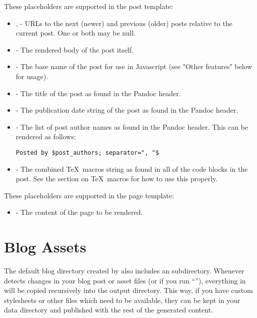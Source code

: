 \documentclass[11pt, letterpaper, oneside, titlepage]{book}
\begin{document}
These placeholders are supported in the post template:

\begin{itemize}
\item{,  - URLs to the
  next (newer) and previous (older) posts relative to the current
  post.  One or both may be null.}
\item{ - The rendered body of the post itself.}
\item{ - The base name of the post for use in
  Javascript (see "Other features" below for usage).}
\item{ - The title of the post as found in the Pandoc
  header.}
\item{ - The publication date string of the post as
  found in the Pandoc header.}
\item{ - The list of post author names as found in
  the Pandoc header.  This can be rendered as follows:
\begin{verbatim}
Posted by $post_authors; separator=", "$
\end{verbatim}
}
\item{ - The combined \TeX\ macros string as
  found in all of the  code blocks in the post.  See
  the section on \TeX\ macros for how to use this properly.}
\end{itemize}

These placeholders are supported in the page template:

\begin{itemize}
\item{ - The content of the page to be rendered.}
\end{itemize}

\section{Blog Assets}

The default blog directory created by  also includes an
 subdirectory.  Whenever  detects changes in your
blog post or asset files (or if you run ``''), everything in
 will be copied recursively into the output directory.
This way, if you have custom stylesheets or other files which need to
be available, they can be kept in your data directory and published
with the rest of the generated content.
\end{document}
